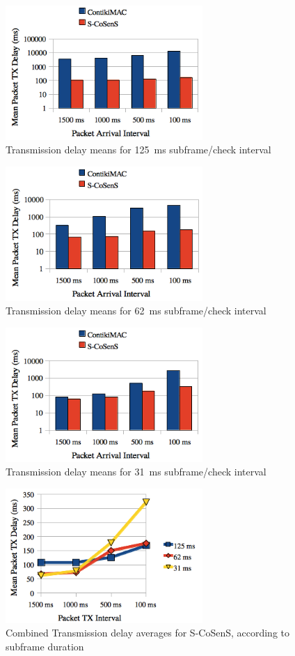 \documentclass[conference]{IEEEtran}
\begin{document}
\begin{figure}
  \centering
  \includegraphics[width=7.5cm]{graphes/Delays8Hz.png}
  \caption{Transmission delay means for 125~ms subframe/check interval}
  \label{FigDelays8Hz}
\end{figure}
\begin{figure}
  \centering
  \includegraphics[width=7.5cm]{graphes/Delays16Hz.png}
  \caption{Transmission delay means for 62~ms subframe/check interval}
  \label{FigDelays16Hz}
\end{figure}
\begin{figure}
  \centering
  \includegraphics[width=7.5cm]{graphes/Delays32Hz.png}
  \caption{Transmission delay means for 31~ms subframe/check interval}
  \label{FigDelays32Hz}
\end{figure}
\begin{figure}
  \centering
  \includegraphics[width=7.5cm]{graphes/DelaysStabilitySCoSenS.png}
  \caption{Combined Transmission delay averages for S-CoSenS,
           according to subframe duration}
  \label{FigDelaysSCoSenS}
\end{figure}
\end{document}

